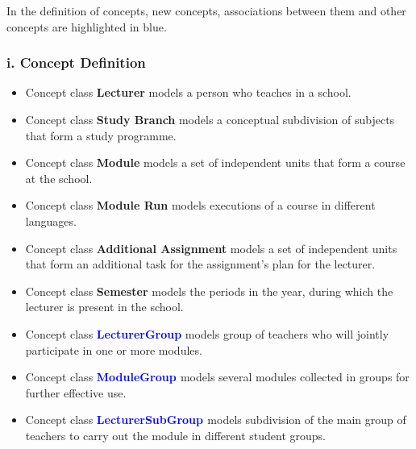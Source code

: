 \documentclass{scrartcl}
\begin{document}
In the definition of concepts, new concepts, associations between them and other concepts are highlighted in blue.

	    \subsubsection{i. Concept Definition}
	    
	    \begin{itemize}
	    \item Concept class \textbf{Lecturer} models a person who teaches in a school.
	     \item Concept class \textbf{Study Branch} models a conceptual subdivision of subjects that form a study programme.
	      \item Concept class \textbf{Module} models a set of independent units that form a course at the school.
	       \item Concept class \textbf{Module Run } models executions of a course in different languages.
	       	      \item Concept class \textbf{Additional Assignment} models a set of independent units that form an additional task for the assignment's plan for the lecturer.
  \item Concept class \textbf{Semester} models the periods in the year, during which the lecturer is present in the school.
  \item Concept class \textbf{\textcolor{blue}{ LecturerGroup}} models   group of teachers who will jointly participate in one or more modules.
   \item Concept class \textbf{\textcolor{blue}{ModuleGroup }}  models
   several modules collected in groups for further effective use.
     \item Concept class \textbf{\textcolor{blue}{LecturerSubGroup }} models subdivision of the main group of teachers to carry out the module in different student groups.
     
	         
	    \end{itemize}
\end{document}
